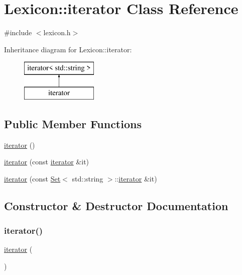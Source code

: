 \hypertarget{classLexicon_1_1iterator}{}\section{Lexicon\+:\+:iterator Class Reference}
\label{classLexicon_1_1iterator}


{\ttfamily \#include $<$lexicon.\+h$>$}

Inheritance diagram for Lexicon\+:\+:iterator\+:\begin{figure}[H]
\begin{center}
\leavevmode
\includegraphics[height=2.000000cm]{classLexicon_1_1iterator}
\end{center}
\end{figure}
\subsection*{Public Member Functions}
\begin{DoxyCompactItemize}
\item 
\mbox{\hyperlink{classLexicon_1_1iterator_a67d652c2433cf9217ed2a1485092fdd1}{iterator}} ()
\item 
\mbox{\hyperlink{classLexicon_1_1iterator_a698b7553261e7209d6c29fb55627dce4}{iterator}} (const \mbox{\hyperlink{classLexicon_1_1iterator}{iterator}} \&it)
\item 
\mbox{\hyperlink{classLexicon_1_1iterator_a6cb8fe4bd22d3efd7d0d01387a001009}{iterator}} (const \mbox{\hyperlink{classstanfordcpplib_1_1collections_1_1GenericSet}{Set}}$<$ std\+::string $>$\+::\mbox{\hyperlink{classLexicon_1_1iterator}{iterator}} \&it)
\end{DoxyCompactItemize}


\subsection{Constructor \& Destructor Documentation}
\mbox{\label{classLexicon_1_1iterator_a67d652c2433cf9217ed2a1485092fdd1}} 
\subsubsection{\texorpdfstring{iterator()}{iterator()}\hspace{0.1cm}{\footnotesize\ttfamily [1/3]}}
{\footnotesize\ttfamily \mbox{\hyperlink{classLexicon_1_1iterator}{iterator}} (\begin{DoxyParamCaption}{ }\end{DoxyParamCaption})\hspace{0.3cm}{\ttfamily [inline]}}

